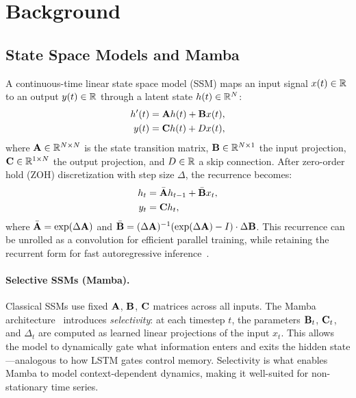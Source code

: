 
\section{Background}
\label{sec:background}

\subsection{State Space Models and Mamba}

A continuous-time linear state space model (SSM) maps an input signal
$x(t) \in \mathbb{R}$ to an output $y(t) \in \mathbb{R}$ through a latent state
$h(t) \in \mathbb{R}^N$:
\begin{align}
    h'(t) &= \mathbf{A} h(t) + \mathbf{B} x(t), \label{eq:ssm_continuous_h} \\
    y(t) &= \mathbf{C} h(t) + D x(t), \label{eq:ssm_continuous_y}
\end{align}
where $\mathbf{A} \in \mathbb{R}^{N \times N}$ is the state transition matrix,
$\mathbf{B} \in \mathbb{R}^{N \times 1}$ the input projection, $\mathbf{C} \in \mathbb{R}^{1 \times N}$
the output projection, and $D \in \mathbb{R}$ a skip connection. After
zero-order hold (ZOH) discretization with step size $\Delta$, the
recurrence becomes:
\begin{align}
    h_t &= \bar{\mathbf{A}} h_{t-1} + \bar{\mathbf{B}} x_t, \label{eq:ssm_discrete_h} \\
    y_t &= \mathbf{C} h_t, \label{eq:ssm_discrete_y}
\end{align}
where $\bar{\mathbf{A}} = \exp(\Delta \mathbf{A})$ and $\bar{\mathbf{B}} = (\Delta \mathbf{A})^{-1}
(\exp(\Delta \mathbf{A}) - I) \cdot \Delta \mathbf{B}$. This recurrence can be
unrolled as a convolution for efficient parallel training, while
retaining the recurrent form for fast autoregressive
inference~\citep{gu2021hippo}.

\paragraph{Selective SSMs (Mamba).}
Classical SSMs use fixed $\mathbf{A}$, $\mathbf{B}$, $\mathbf{C}$ matrices across all
inputs. The Mamba architecture~\citep{gu2023mamba} introduces
\emph{selectivity}: at each timestep $t$, the parameters $\mathbf{B}_t$,
$\mathbf{C}_t$, and $\Delta_t$ are computed as learned linear projections of
the input $x_t$. This allows the model to dynamically gate what
information enters and exits the hidden state---analogous to how LSTM
gates control memory. Selectivity is what enables Mamba to model
context-dependent dynamics, making it well-suited for non-stationary
time series.

